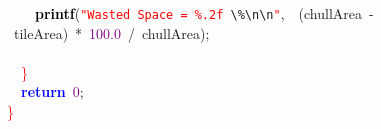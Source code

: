 \mbox{}\ \ \ \ \textbf{\textcolor{Black}{printf}}\textcolor{BrickRed}{(}\texttt{\textcolor{Red}{"{}Wasted\ Space\ =\ \%.2f\ }}\texttt{\textcolor{CarnationPink}{\textbackslash{}\%\textbackslash{}n\textbackslash{}n}}\texttt{\textcolor{Red}{"{}}}\textcolor{BrickRed}{,}\ \ \textcolor{BrickRed}{(}chullArea\ \textcolor{BrickRed}{-}\ tileArea\textcolor{BrickRed}{)}\ \textcolor{BrickRed}{*}\ \textcolor{Purple}{100.0}\ \textcolor{BrickRed}{/}\ chullArea\textcolor{BrickRed}{);} \\
\mbox{}\ \ \  \\
\mbox{}\ \ \textcolor{Red}{\}} \\
\mbox{}\ \ \textbf{\textcolor{Blue}{return}}\ \textcolor{Purple}{0}\textcolor{BrickRed}{;} \\
\mbox{}\textcolor{Red}{\}} \\

